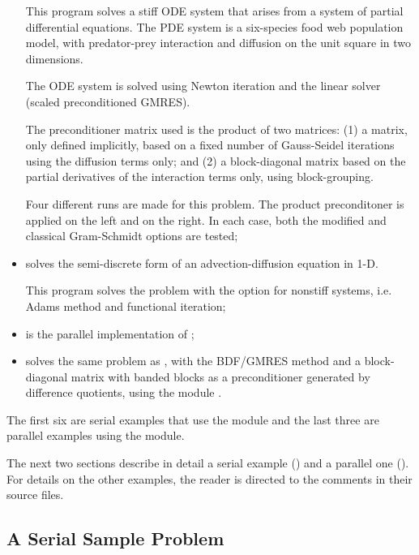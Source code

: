 \begin{itemize}
  This program solves a stiff ODE system that arises from a system     
  of partial differential equations.  The PDE system is a six-species
  food web population model, with predator-prey interaction and diffusion 
  on the unit square in two dimensions.

  The ODE system is solved using Newton iteration and the      
  {\cvspgmr} linear solver (scaled preconditioned GMRES).                  
                                                                        
  The preconditioner matrix used is the product of two matrices:         
  (1) a matrix, only defined implicitly, based on a fixed number of     
  Gauss-Seidel iterations using the diffusion terms only; and               
  (2) a block-diagonal matrix based on the partial derivatives of the   
  interaction terms only, using block-grouping.                          
                                                                        
  Four different runs are made for this problem.                        
  The product preconditoner is applied on the left and on the right.    
  In each case, both the modified and classical Gram-Schmidt options    
  are tested;
\item {}
  solves the semi-discrete form of an advection-diffusion equation in 1-D.

  This program solves the problem with the option for nonstiff systems,
  i.e. Adams method and functional iteration;
\item {}
  is the parallel implementation of ;
\item {}
  solves the same problem as , with the BDF/GMRES method 
  and a block-diagonal matrix with banded blocks as a preconditioner 
  generated by difference quotients, using the module {\cvbbdpre}.
\end{itemize}
The first six are serial examples that use the {\nvecs} module and
the last three are parallel examples using the {\nvecp} module.

The next two sections describe in detail a serial example () and
a parallel one (). For details on the other examples, the reader is
directed to the comments in their source files.


\subsection{A Serial Sample Problem}\label{ss:serial_sim_ex}

